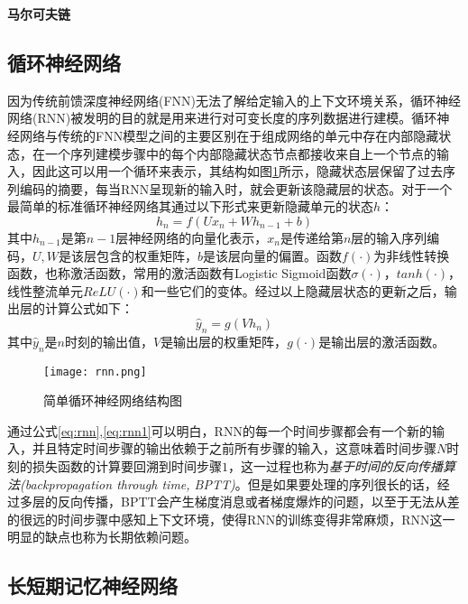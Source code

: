 \textbf{马尔可夫链}

\subsection{循环神经网络}

因为传统前馈深度神经网络(FNN)无法了解给定输入的上下文环境关系，循环神经网络(RNN)\cite{RNN1994}被发明的目的就是用来进行对可变长度的序列数据进行建模。循环神经网络与传统的FNN模型之间的主要区别在于组成网络的单元中存在内部隐藏状态，在一个序列建模步骤中的每个内部隐藏状态节点都接收来自上一个节点的输入，因此这可以用一个循环来表示，其结构如图\ref{fig:rnn}所示，隐藏状态层保留了过去序列编码的摘要，每当RNN呈现新的输入时，就会更新该隐藏层的状态。对于一个最简单的标准循环神经网络其通过以下形式来更新隐藏单元的状态$h$：
\begin{equation}
  \label{eq:rnn}
  h_{n} = f \left(Ux_{n} + Wh_{n-1} + b \right)
\end{equation}
其中$h_{n-1}$是第$n-1$层神经网络的向量化表示，$x_{n}$是传递给第$n$层的输入序列编码，$U,W$是该层包含的权重矩阵，$b$是该层向量的偏置。函数$f(\cdot)$为非线性转换函数，也称激活函数，常用的激活函数有Logistic Sigmoid函数$\sigma(\cdot )$，$tanh(\cdot)$，线性整流单元$ReLU(\cdot)$和一些它们的变体。经过以上隐藏层状态的更新之后，输出层的计算公式如下：
\begin{equation}
  \label{eq:rnn1}
  \hat{y}_{n} = g(Vh_{n})
\end{equation}
其中$\hat{y}_{n}$是$n$时刻的输出值，$V$是输出层的权重矩阵，$g(\cdot)$是输出层的激活函数。

\begin{figure}[htb]%
  \centering
  \texttt{[image: rnn.png]}\\
  \caption{简单循环神经网络结构图}
  \label{fig:rnn}
\end{figure}

通过公式\ref{eq:rnn},\ref{eq:rnn1}可以明白，RNN的每一个时间步骤都会有一个新的输入，并且特定时间步骤的输出依赖于之前所有步骤的输入，这意味着时间步骤$N$时刻的损失函数的计算要回溯到时间步骤$1$，这一过程也称为\textit{基于时间的反向传播算法(backpropagation through time, BPTT)}。但是如果要处理的序列很长的话，经过多层的反向传播，BPTT会产生梯度消息或者梯度爆炸的问题，以至于无法从差的很远的时间步骤中感知上下文环境，使得RNN的训练变得非常麻烦，RNN这一明显的缺点也称为长期依赖问题。

\subsection{长短期记忆神经网络}

